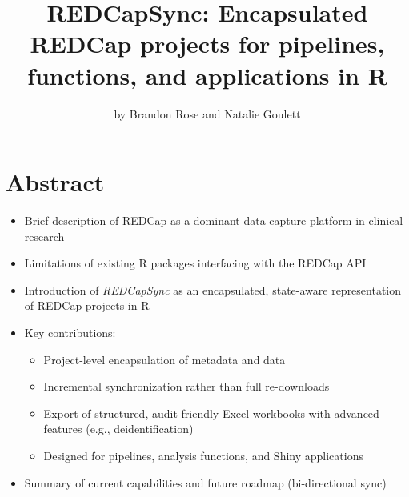 \title{REDCapSync: Encapsulated REDCap projects for pipelines, functions, and applications in R}


\author{by Brandon Rose and Natalie Goulett}

\maketitle


\section{Abstract}\label{abstract}

\begin{itemize}
\tightlist
\item
  Brief description of REDCap as a dominant data capture platform in clinical research\\
\item
  Limitations of existing R packages interfacing with the REDCap API\\
\item
  Introduction of \emph{REDCapSync} as an encapsulated, state-aware representation of REDCap projects in R\\
\item
  Key contributions:

  \begin{itemize}
  \tightlist
  \item
    Project-level encapsulation of metadata and data
  \item
    Incremental synchronization rather than full re-downloads
  \item
    Export of structured, audit-friendly Excel workbooks with advanced features (e.g., deidentification)
  \item
    Designed for pipelines, analysis functions, and Shiny applications\\
  \end{itemize}
\item
  Summary of current capabilities and future roadmap (bi-directional sync)
\end{itemize}

